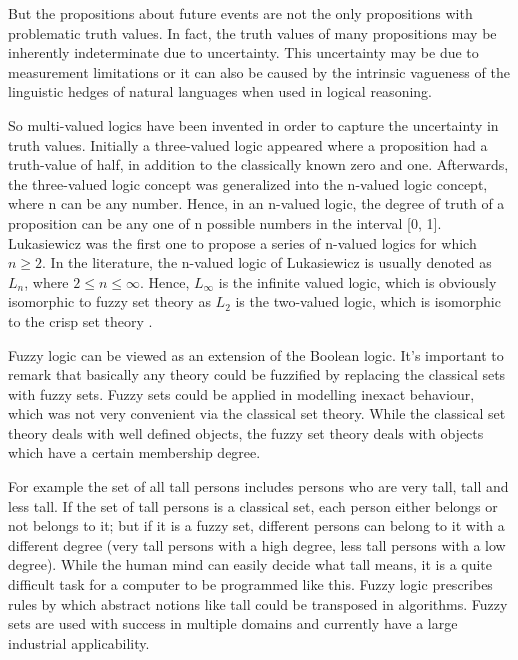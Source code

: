But the propositions about future events are not the only propositions with problematic truth values. In fact, the truth values of many propositions may be inherently indeterminate due to uncertainty. This uncertainty may be due to measurement limitations or it can also be caused by the intrinsic vagueness of the linguistic hedges of natural languages when used in logical reasoning.

So multi-valued logics have been invented in order to capture the uncertainty in truth values. Initially a three-valued logic appeared where a proposition had a truth-value of half, in addition to the classically known zero and one. Afterwards, the three-valued logic concept was generalized into the n-valued logic concept, where n can be any number. Hence, in an n-valued logic, the degree of truth of a proposition can be any one of n possible numbers in the interval [0, 1]. Lukasiewicz was the first one to propose a series of n-valued logics for which $n \geq 2$. In the literature, the n-valued logic of Lukasiewicz is usually denoted as $L_{n}$,
where $2 \leq n \leq \infty$. Hence, $L_{\infty}$ is the infinite valued logic, which is obviously isomorphic to
fuzzy set theory as $L_{2}$ is the two-valued logic, which is isomorphic to the crisp set theory \cite{Klir95Fuzzy}.

Fuzzy logic can be viewed as an extension of the Boolean logic. 
It's important to remark that basically any theory could be fuzzified by replacing the classical sets with fuzzy sets.
Fuzzy sets could be applied in modelling inexact behaviour, which was not very convenient via the classical set theory. While the classical set theory deals with well defined objects, the fuzzy set theory deals with objects which have a certain membership degree.

For example the set of all tall persons includes persons who are very tall, tall and less tall. If the set of tall persons is a classical set, each person either belongs or not belongs to it; but if it is a fuzzy set, different persons can belong to it with a different degree (very tall persons with a high degree, less tall persons with a low degree). While the human mind can easily decide what tall means, it is a quite difficult task for a computer to be programmed like this. Fuzzy logic prescribes rules by which abstract notions like tall could be transposed in algorithms. Fuzzy sets are used with success in multiple domains and currently have a large industrial applicability.


